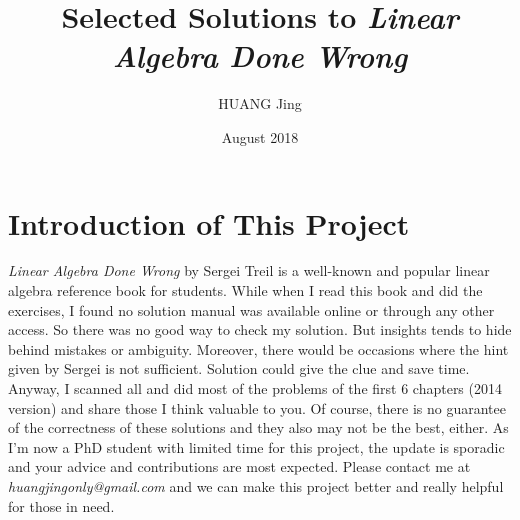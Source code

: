 \documentclass[11pt, a4paper]{article}
\title{Selected Solutions to \emph{Linear Algebra Done Wrong}}
\author{HUANG Jing }
\date{August 2018}
\begin{document}
\maketitle

\section*{Introduction of This Project}
\emph{Linear Algebra Done Wrong} by Sergei Treil is a well-known and popular linear algebra 
reference book for students. While when I read this book and did the exercises, I found no solution manual was available online or through any other access. So there was no good way to check my solution. But insights tends to hide behind mistakes or ambiguity. Moreover, there would be occasions where the hint given by Sergei is not sufficient. Solution could give the clue and save time. Anyway, I scanned all and did most of the problems of the first 6 chapters (2014 version) and share those I think valuable to you. Of course, there is no guarantee of the correctness of these solutions and they also may not be the best, either. As I'm now a PhD student with limited time for this project, the update is sporadic and your advice and contributions are most expected. Please contact me at \emph{huangjingonly@gmail.com} and we can make this project better and really helpful for those in need. 
\end{document}
